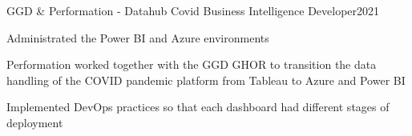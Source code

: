 \resumeSubheading
  {GGD \& Performation - Datahub Covid}{}
  {Business Intelligence Developer}{2021}
  \vspace{\experienceItemSpacing}
  \resumeItemListStart
\item Administrated the Power BI and Azure environments
\item Performation worked together with the GGD GHOR to transition the data handling of the COVID pandemic platform from Tableau to Azure and Power BI
\item Implemented DevOps practices so that each dashboard had different stages of deployment
  \resumeItemListEnd 